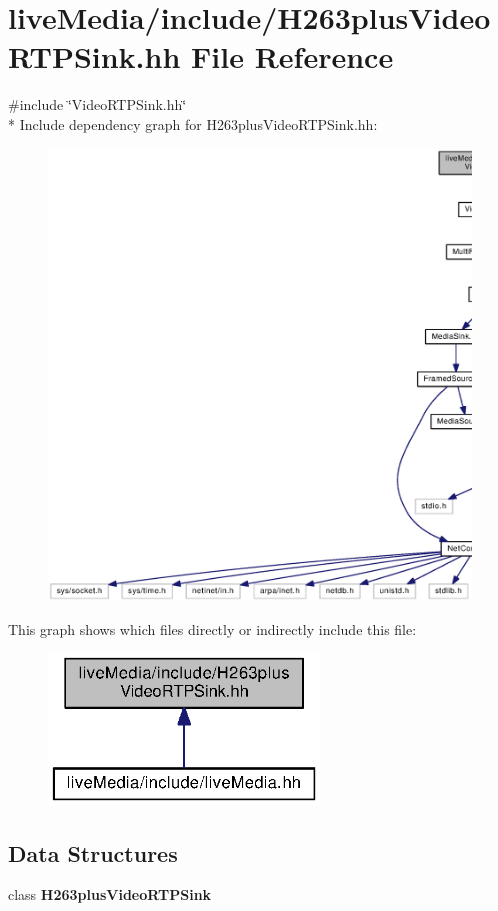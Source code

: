 \section{live\+Media/include/\+H263plus\+Video\+R\+T\+P\+Sink.hh File Reference}
\label{H263plusVideoRTPSink_8hh}
{\ttfamily \#include \char`\"{}Video\+R\+T\+P\+Sink.\+hh\char`\"{}}\\*
Include dependency graph for H263plus\+Video\+R\+T\+P\+Sink.\+hh\+:
\nopagebreak
\begin{figure}[H]
\begin{center}
\leavevmode
\includegraphics[width=350pt]{H263plusVideoRTPSink_8hh__incl}
\end{center}
\end{figure}
This graph shows which files directly or indirectly include this file\+:
\nopagebreak
\begin{figure}[H]
\begin{center}
\leavevmode
\includegraphics[width=204pt]{H263plusVideoRTPSink_8hh__dep__incl}
\end{center}
\end{figure}
\subsection*{Data Structures}
\begin{DoxyCompactItemize}
\item 
class {\bf H263plus\+Video\+R\+T\+P\+Sink}
\end{DoxyCompactItemize}

